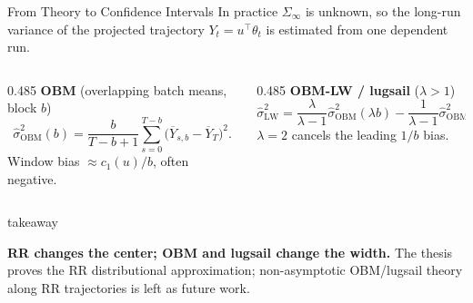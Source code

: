 \documentclass[11pt,aspectratio=169,xcolor=table]{beamer}
\newcommand{\colhead}[1]{\textcolor{ThesisBlue}{\bfseries #1}}
\newenvironment{takeawaybox}
  {\begin{beamercolorbox}[wd=\linewidth,sep=0.52em,leftskip=0.25em,rightskip=0.25em,rounded=true]{takeaway}%
   \begin{minipage}{0.96\linewidth}%
   \llap{{\color{ThesisGreen}\rule{2.5pt}{2.6ex}}\hspace{0.5em}}}
  {\end{minipage}\end{beamercolorbox}}
\begin{document}
\begin{frame}{From Theory to Confidence Intervals}
\small
In practice $\Sigma_\infty$ is unknown, so the long-run variance of the
projected trajectory $Y_t=u^\top\theta_t$ is estimated from one dependent run.

\vspace{0.5em}
\begin{columns}[T,onlytextwidth]
  \begin{column}{0.485\textwidth}
    \colhead{OBM} (overlapping batch means, block $b$)
    \[
      \widehat\sigma_{\mathrm{OBM}}^2(b)
      =\frac{b}{T-b+1}\sum_{s=0}^{T-b}
        \bigl(\overline Y_{s,b}-\overline Y_T\bigr)^2.
    \]
    Window bias $\approx c_1(u)/b$, often negative.
  \end{column}
  \begin{column}{0.485\textwidth}
    \colhead{OBM-LW / lugsail} ($\lambda>1$)
    \[
      \widehat\sigma_{\mathrm{LW}}^2
      =\frac{\lambda}{\lambda-1}\widehat\sigma_{\mathrm{OBM}}^2(\lambda b)
       -\frac1{\lambda-1}\widehat\sigma_{\mathrm{OBM}}^2(b).
    \]
    $\lambda=2$ cancels the leading $1/b$ bias.
  \end{column}
\end{columns}

\vspace{0.65em}
\begin{takeawaybox}
\textbf{RR changes the center; OBM and lugsail change the width.} The thesis
proves the RR distributional approximation; non-asymptotic OBM/lugsail theory
along RR trajectories is left as future work.
\end{takeawaybox}
\end{frame}
\end{document}
